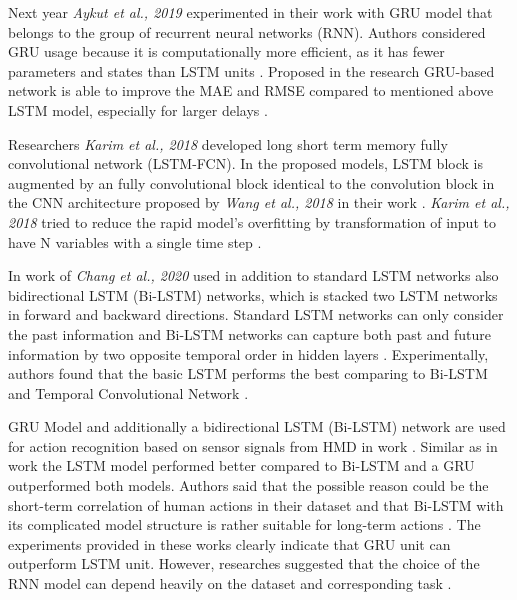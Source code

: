 Next year \textit{Aykut et al., 2019} experimented in their work \cite{telepresence} with GRU model that belongs to the group of recurrent neural networks (RNN). Authors considered GRU usage because it is computationally more efficient, as it has fewer parameters and states than LSTM units \cite{telepresence}. Proposed in the research GRU-based network is able to improve the MAE and RMSE compared to mentioned above LSTM model, especially for larger delays \cite{telepresence}. 

Researchers \textit{Karim et al., 2018} developed long short term memory fully convolutional network (LSTM-FCN). In the proposed models, LSTM block is augmented by an fully convolutional block \cite{lstm_fcn} identical to the convolution block in the CNN architecture proposed by \textit{Wang et al., 2018} in their work \cite{timeseries_scratch}. \textit{Karim et al., 2018} tried to reduce the rapid model's overfitting by transformation of input to have N variables with a single time step \cite{lstm_fcn}.

In work of \textit{Chang et al., 2020} used in addition to standard LSTM networks also bidirectional LSTM (Bi-LSTM) networks, which is stacked two LSTM networks in forward and backward directions. Standard LSTM networks can only consider the past information and Bi-LSTM networks can capture both past and future information by two opposite temporal order in hidden layers \cite{6DoF_Tracking}. Experimentally, authors found that the basic LSTM performs the best comparing to Bi-LSTM and Temporal Convolutional Network  \cite{6DoF_Tracking}.

GRU Model and additionally a bidirectional LSTM (Bi-LSTM) network are used for action recognition based on sensor signals from HMD in work \cite{action_recognition}. Similar as in work \cite{6DoF_Tracking} the LSTM model performed better compared to Bi-LSTM and a GRU outperformed both models. Authors said that the possible reason could be the short-term correlation of human actions in their dataset and that Bi-LSTM with its complicated model structure is rather suitable for long-term actions \cite{action_recognition}. The experiments provided in these works clearly indicate that GRU unit can outperform LSTM unit. However, researches suggested that the choice of the RNN model can depend heavily on the dataset and corresponding task \cite{empirical_evaluation}.